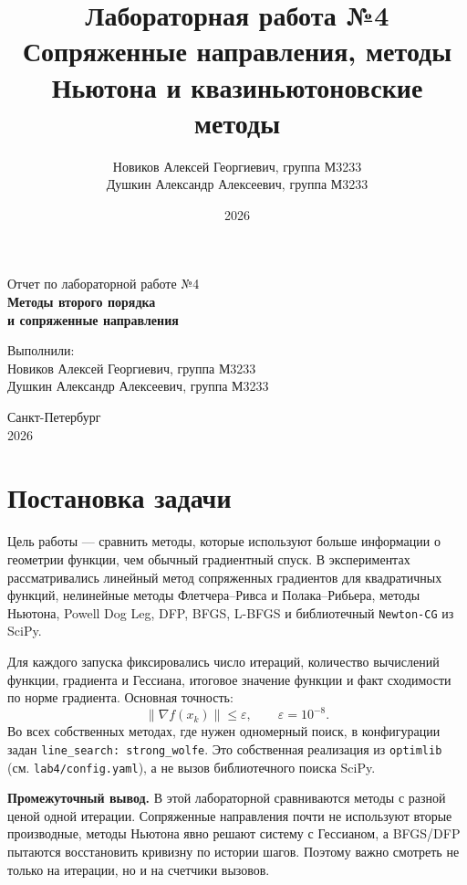 \documentclass[14pt,a4paper]{extarticle}
\title{Лабораторная работа №4\\Сопряженные направления, методы Ньютона и квазиньютоновские методы}
\author{
    Новиков Алексей Георгиевич, группа М3233\\
    Душкин Александр Алексеевич, группа М3233
}
\date{2026}
\begin{document}
\hypersetup{pageanchor=false}
\begin{titlepage}
    \begin{center}
        {\large Отчет по лабораторной работе №4}\\[0.5cm]
        {\LARGE \textbf{Методы второго порядка\\и сопряженные направления}}\\[2cm]

        \begin{flushright}
            Выполнили:\\[0.2cm]
            Новиков Алексей Георгиевич, группа М3233\\
            Душкин Александр Алексеевич, группа М3233\\[0.5cm]
        \end{flushright}

        \vfill
        Санкт-Петербург\\[0.2cm]
        2026
    \end{center}
\end{titlepage}
\hypersetup{pageanchor=true}

\tableofcontents
\newpage

\section{Постановка задачи}

Цель работы --- сравнить методы, которые используют больше информации о геометрии функции, чем обычный градиентный спуск. В экспериментах рассматривались линейный метод сопряженных градиентов для квадратичных функций, нелинейные методы Флетчера--Ривса и Полака--Рибьера, методы Ньютона, Powell Dog Leg, DFP, BFGS, L-BFGS и библиотечный \texttt{Newton-CG} из SciPy.

Для каждого запуска фиксировались число итераций, количество вычислений функции, градиента и Гессиана, итоговое значение функции и факт сходимости по норме градиента. Основная точность:
\[
    \|\nabla f(x_k)\|\le \varepsilon,\qquad \varepsilon=10^{-8}.
\]
Во всех собственных методах, где нужен одномерный поиск, в конфигурации задан \texttt{line\_search: strong\_wolfe}. Это собственная реализация из \texttt{optimlib} (см. \texttt{lab4/config.yaml}), а не вызов библиотечного поиска SciPy.

\textbf{Промежуточный вывод.} В этой лабораторной сравниваются методы с разной ценой одной итерации. Сопряженные направления почти не используют вторые производные, методы Ньютона явно решают систему с Гессианом, а BFGS/DFP пытаются восстановить кривизну по истории шагов. Поэтому важно смотреть не только на итерации, но и на счетчики вызовов.
\end{document}
